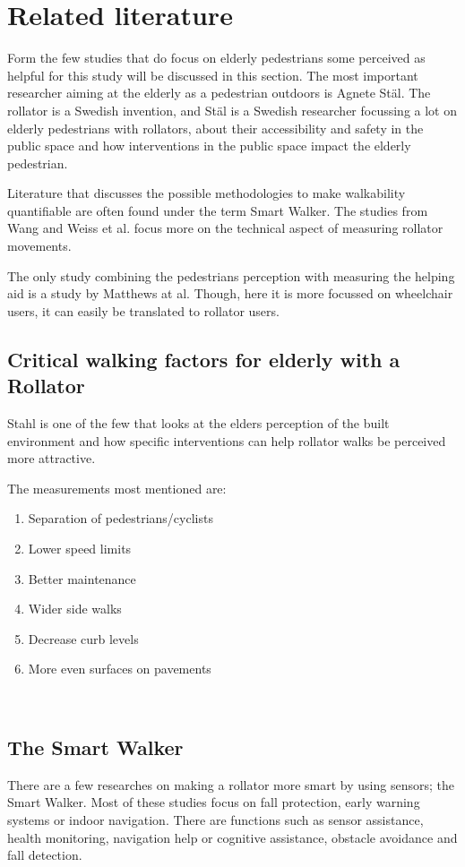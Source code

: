 \section{Related literature}\label{literature}
Form the few studies that do focus on elderly pedestrians some perceived as helpful for this study will be discussed in this section.
The most important researcher aiming at the elderly as a pedestrian outdoors is Agnete St\"al. The rollator is a Swedish invention, and St\"al is a Swedish researcher focussing a lot on elderly pedestrians with rollators, about their accessibility and safety in the public space and how interventions in the public space impact the elderly pedestrian.   

Literature that discusses the possible methodologies to make walkability quantifiable are often found under the term Smart Walker. The studies from Wang and Weiss  et al. focus more on the technical aspect of measuring rollator movements. 

The only study combining the pedestrians perception with measuring the helping aid is a study by Matthews at al. Though, here it is more focussed on wheelchair users, it can easily be translated to rollator users. 

\subsection{Critical walking factors for elderly with a Rollator}
Stahl is one of the few that looks at the elders perception of the built environment and how specific interventions can help rollator walks be perceived more attractive.~\cite{Stahl2008, Stahl2013}

The measurements most mentioned are:
\begin{enumerate}
\item Separation of pedestrians/cyclists
\item Lower speed limits
\item Better maintenance
\item Wider side walks
\item Decrease curb levels
\item More even surfaces on pavements
\end{enumerate}~\cite{Stahl2008}


\subsection{The Smart Walker}

There are a few researches on making a rollator more smart by using sensors; the Smart Walker. Most of these studies focus on fall protection, early warning systems or indoor navigation. There are functions such as sensor assistance, health monitoring, navigation help or cognitive assistance, obstacle avoidance and fall detection.~\cite{Wang2015} 

